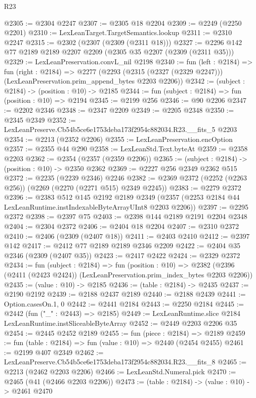 \begin{lexlean}{R23}
\begin{coremodule}
@2305 := @2304 @2247
@2307 := @2305 @18 @2204
@2309 := @2249 (@2250 @2201)
@2310 := LexLeanTarget.TargetSemantics.lookup
@2311 := @2310 @2247
@2315 := @2302 (@2307 (@2309 (@2311 @18)))
@2327 := @2296 @142 @77 @2189 @2189 @2207 @2209 (@2305 @35 @2207 (@2309 (@2311 @35)))
@2329 := LexLeanPreservation.convL_nil @2198
@2340 := fun (left : @2184) =>
  fun (right : @2184) =>
  @2277 (@2293 (@2315 (@2327 (@2329 @2247))) (LexLeanPreservation.prim_append_bytes @2203 @2206))
@2342 := (subject : @2184) -> (position : @10) -> @2185
@2344 := fun (subject : @2184) => fun (position : @10) => @2194
@2345 := @2199 @256
@2346 := @90 @2206
@2347 := @2202 @2346
@2348 := @2347 @2209
@2349 := @2205 @2348
@2350 := @2345 @2349
@2352 := LexLeanPreserve.Cb54b5ce6e1753deba173f2954c882034.R23.__fits_5 @2203
@2354 := @2213 (@2352 @2206)
@2355 := LexLeanPreservation.encOption
@2357 := @2355 @44 @290
@2358 := LexLeanStd.Text.byteAt
@2359 := @2358 @2203
@2362 := @2354 (@2357 (@2359 @2206))
@2365 := (subject : @2184) -> (position : @10) -> @2350 @2362
@2369 := @2227 @256 @2349 @2362 @515
@2372 := @2235 (@2239 @2346) @2246
@2382 := @2369 @2372 (@2252 (@2263 @256)) (@2269 (@2270 (@2271 @515) @2349 @2245))
@2383 := @2279 @2372
@2396 := @2383
    @512
    @145
    @2192
    @2189
    @2349
    (@2357 (@2253 @2184 @44 LexLeanRuntime.instIndexableByteArrayUInt8 @2203 @2206))
@2397 := @2295 @2372
@2398 := @2397 @75
@2403 := @2398 @144 @2189 @2191 @2204 @2348
@2404 := @2304 @2372
@2406 := @2404 @18 @2204
@2407 := @2310 @2372
@2410 := @2406 (@2309 (@2407 @18))
@2411 := @2403 @2410
@2412 := @2397 @142
@2417 := @2412 @77 @2189 @2189 @2346 @2209
@2422 := @2404 @35 @2346 (@2309 (@2407 @35))
@2423 := @2417 @2422
@2424 := @2329 @2372
@2434 := fun (subject : @2184) =>
  fun (position : @10) =>
  @2382 (@2396 (@2411 (@2423 @2424)) (LexLeanPreservation.prim_index_bytes @2203 @2206))
@2435 := (value : @10) -> @2185
@2436 := (table : @2184) -> @2435
@2437 := @2190 @2192
@2439 := @2188 @2437 @2189
@2440 := @2188 @2439
@2441 := Option.casesOn.{1, 0}
@2442 := @2441 @2184
@2443 := @2250 @2184
@2445 := @2442 (fun ("_" : @2443) => @2185)
@2449 := LexLeanRuntime.slice @2184 LexLeanRuntime.instSliceableByteArray
@2452 := @2449 @2203 @2206 @35
@2454 := @2445 @2452 @2189
@2455 := fun (piece : @2184) => @2189
@2459 := fun (table : @2184) => fun (value : @10) => @2440 (@2454 @2455)
@2461 := @2199 @407 @2349
@2462 := LexLeanPreserve.Cb54b5ce6e1753deba173f2954c882034.R23.__fits_8
@2465 := @2213 (@2462 @2203 @2206)
@2466 := LexLeanStd.Numeral.pick
@2470 := @2465 (@41 (@2466 @2203 @2206))
@2473 := (table : @2184) -> (value : @10) -> @2461 @2470

\end{coremodule}
\end{lexlean}
